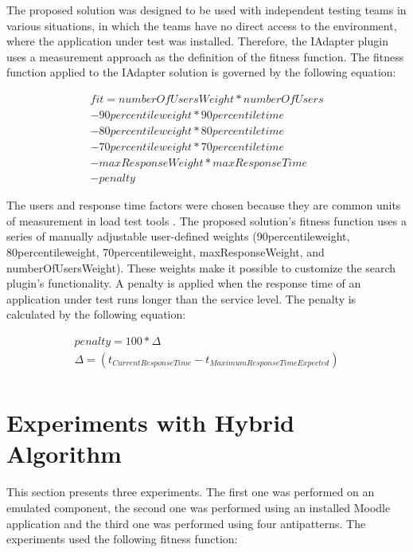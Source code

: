 \documentclass[espaco=umemeio,chapter=TITLE,twoside,openright]{abnt}
\begin{document}
The proposed solution was designed to be used with independent testing teams in various situations, in which the teams have no direct access to the environment, where the application under test was installed. Therefore, the IAdapter plugin uses a measurement approach as the definition of the fitness function. The fitness function applied to the IAdapter solution is governed by the following equation:

\begin{equation}
\begin{aligned}
fit=numberOfUsersWeight*numberOfUsers\\
-90percentileweight* 90percentiletime\\
-80percentileweight*80percentiletime\\
-70percentileweight*70percentiletime\\
-maxResponseWeight*maxResponseTime\\
-penalty
\end{aligned}
\end{equation}

The users and response time factors were chosen because they are common units of measurement in load test tools \cite{Sandler2004}. The proposed solution's fitness function uses a series of manually adjustable user-defined weights (90percentileweight, 80percentileweight,  70percentileweight, maxResponseWeight, and numberOfUsersWeight). These weights make it possible to customize the search plugin's functionality. A penalty is applied when the response time of an application under test runs longer than the service level. The penalty is calculated by the following equation:

\begin{equation}
\begin{aligned}
penalty=100 * \Delta \\
\Delta=(t_{Current Response Time} - t_{Maximum Response Time Expected})\\
\end{aligned}
\end{equation}

\section{Experiments with Hybrid Algorithm}

This section presents three experiments. The first one was performed on an emulated component, the second one was performed using an installed Moodle application and the third one was performed using four antipatterns. The experiments used the following fitness function:
\end{document}
